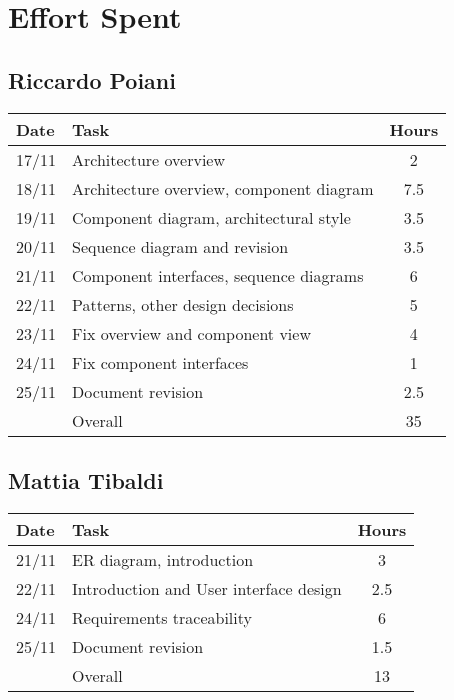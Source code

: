 \section{Effort Spent}

\subsection{Riccardo Poiani}

\begin{table}[H]
\begin{tabularx}{\textwidth}{|l|X|c|}
\hline
\rowcolor[HTML]{C0C0C0} 
Date & Task & Hours\\ \hline
17/11 & Architecture overview & 2\\ \hline
18/11 & Architecture overview, component diagram & 7.5 \\ \hline
19/11 & Component diagram, architectural style & 3.5\\ \hline
20/11 & Sequence diagram and revision & 3.5\\ \hline
21/11 & Component interfaces, sequence diagrams & 6\\ \hline
22/11 & Patterns, other design decisions & 5 \\ \hline
23/11 & Fix overview and component view & 4  \\  \hline
24/11 & Fix component interfaces & 1 \\ \hline
25/11 & Document revision & 2.5 \\ \hline
\rowcolor[HTML]{C0C0C0} 
& Overall & 35 \\ \hline
\end{tabularx}
\end{table}

\subsection{Mattia Tibaldi}

\begin{table}[H]
\begin{tabularx}{\textwidth}{|l|X|c|}
\hline
\rowcolor[HTML]{C0C0C0} 
Date & Task & Hours\\ \hline
21/11 & ER diagram, introduction & 3 \\ \hline
22/11 & Introduction and User interface design & 2.5 \\ \hline
24/11 & Requirements traceability & 6 \\ \hline 
25/11 & Document revision & 1.5 \\ \hline
\rowcolor[HTML]{C0C0C0} 
& Overall & 13\\ \hline
\end{tabularx}
\end{table}

